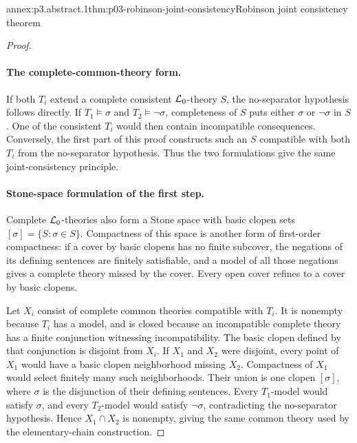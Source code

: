 \begin{annexitem}{annex:p3.abstract.1}{thm:p03-robinson-joint-consistency}{Robinson joint consistency theorem}
\begin{proof}
\paragraph{The complete-common-theory form.}
If both \(T_i\) extend a complete consistent \(\mathcal{L}_0\)-theory \(S\),
the no-separator hypothesis follows directly.
If \(T_1\models\sigma\) and \(T_2\models\neg\sigma\), completeness
of \(S\) puts either \(\sigma\) or \(\neg\sigma\) in \(S\).
One of the consistent \(T_i\) would then contain incompatible
consequences.  Conversely, the first part of this proof constructs
such an \(S\) compatible with both \(T_i\) from the no-separator
hypothesis.  Thus the two formulations give the same joint-consistency
principle.

\paragraph{Stone-space formulation of the first step.}
Complete \(\mathcal{L}_0\)-theories also form a Stone space with basic
clopen sets \([\sigma]=\{S:\sigma\in S\}\).
Compactness of this space is another form of first-order compactness:
if a cover by basic clopens has no finite subcover, the negations
of its defining sentences are finitely satisfiable, and a model
of all those negations gives a complete theory missed by the cover.
Every open cover refines to a cover by basic clopens.

Let \(X_i\) consist of complete common theories compatible with \(T_i\).
It is nonempty because \(T_i\) has a model, and is closed because an
incompatible complete theory has a finite conjunction witnessing
incompatibility.  The basic clopen defined by that conjunction
is disjoint from \(X_i\).
If \(X_1\) and \(X_2\) were disjoint, every point of \(X_1\) would
have a basic clopen neighborhood missing \(X_2\).
Compactness of \(X_1\) would select finitely many such neighborhoods.
Their union is one clopen \([\sigma]\), where \(\sigma\) is the
disjunction of their defining sentences.
Every \(T_1\)-model would satisfy \(\sigma\), and every
\(T_2\)-model would satisfy \(\neg\sigma\), contradicting the
no-separator hypothesis.
Hence \(X_1\cap X_2\) is nonempty, giving the same common theory
used by the elementary-chain construction.


\end{proof}
\end{annexitem}
